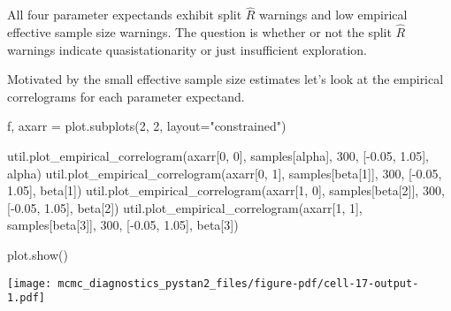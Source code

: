\documentclass[
  letterpaper,
  DIV=11,
  numbers=noendperiod]{scrartcl}
\newenvironment{Shaded}{\begin{snugshade}}{\end{snugshade}}
\newcommand{\DecValTok}[1]{\textcolor[rgb]{0.68,0.00,0.00}{#1}}
\newcommand{\FloatTok}[1]{\textcolor[rgb]{0.68,0.00,0.00}{#1}}
\newcommand{\NormalTok}[1]{\textcolor[rgb]{0.00,0.23,0.31}{#1}}
\newcommand{\OperatorTok}[1]{\textcolor[rgb]{0.37,0.37,0.37}{#1}}
\newcommand{\StringTok}[1]{\textcolor[rgb]{0.13,0.47,0.30}{#1}}
\begin{document}
All four parameter expectands exhibit split \(\hat{R}\) warnings and low
empirical effective sample size warnings. The question is whether or not
the split \(\hat{R}\) warnings indicate quasistationarity or just
insufficient exploration.

Motivated by the small effective sample size estimates let's look at the
empirical correlograms for each parameter expectand.

\begin{Shaded}
\begin{Highlighting}[]
\NormalTok{f, axarr }\OperatorTok{=}\NormalTok{ plot.subplots(}\DecValTok{2}\NormalTok{, }\DecValTok{2}\NormalTok{, layout}\OperatorTok{=}\StringTok{"constrained"}\NormalTok{)}

\NormalTok{util.plot\_empirical\_correlogram(axarr[}\DecValTok{0}\NormalTok{, }\DecValTok{0}\NormalTok{], samples[}\StringTok{\textquotesingle{}alpha\textquotesingle{}}\NormalTok{], }
                                \DecValTok{300}\NormalTok{, [}\OperatorTok{{-}}\FloatTok{0.05}\NormalTok{, }\FloatTok{1.05}\NormalTok{],  }\StringTok{\textquotesingle{}alpha\textquotesingle{}}\NormalTok{)}
\NormalTok{util.plot\_empirical\_correlogram(axarr[}\DecValTok{0}\NormalTok{, }\DecValTok{1}\NormalTok{], samples[}\StringTok{\textquotesingle{}beta[1]\textquotesingle{}}\NormalTok{], }
                                \DecValTok{300}\NormalTok{, [}\OperatorTok{{-}}\FloatTok{0.05}\NormalTok{, }\FloatTok{1.05}\NormalTok{],  }\StringTok{\textquotesingle{}beta[1]\textquotesingle{}}\NormalTok{)}
\NormalTok{util.plot\_empirical\_correlogram(axarr[}\DecValTok{1}\NormalTok{, }\DecValTok{0}\NormalTok{], samples[}\StringTok{\textquotesingle{}beta[2]\textquotesingle{}}\NormalTok{], }
                                \DecValTok{300}\NormalTok{, [}\OperatorTok{{-}}\FloatTok{0.05}\NormalTok{, }\FloatTok{1.05}\NormalTok{],  }\StringTok{\textquotesingle{}beta[2]\textquotesingle{}}\NormalTok{)}
\NormalTok{util.plot\_empirical\_correlogram(axarr[}\DecValTok{1}\NormalTok{, }\DecValTok{1}\NormalTok{], samples[}\StringTok{\textquotesingle{}beta[3]\textquotesingle{}}\NormalTok{], }
                                \DecValTok{300}\NormalTok{, [}\OperatorTok{{-}}\FloatTok{0.05}\NormalTok{, }\FloatTok{1.05}\NormalTok{],  }\StringTok{\textquotesingle{}beta[3]\textquotesingle{}}\NormalTok{)}

\NormalTok{plot.show()}
\end{Highlighting}
\end{Shaded}

\texttt{[image: mcmc\_diagnostics\_pystan2\_files/figure-pdf/cell-17-output-1.pdf]}
\end{document}
